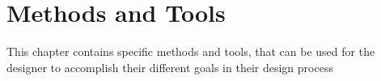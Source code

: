 \chapter{Methods and Tools} \label{chap:methods}
This chapter contains specific methods and tools, that can be used for the
designer to accomplish their different goals in their design process






